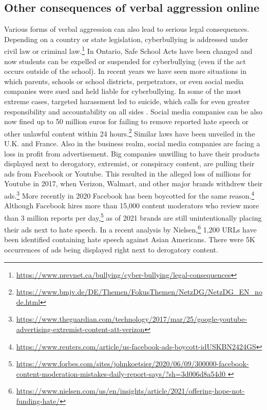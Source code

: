 \documentclass[a4paper,fleqn]{cas-dc}
\begin{document}
\subsection{Other consequences of verbal aggression online}

Various forms of verbal aggression can also lead to serious legal consequences. Depending on a country or state legislation, cyberbullying is addressed under civil law or criminal law.\footnote{\url{https://www.prevnet.ca/bullying/cyber-bullying/legal-consequences}} In Ontario, Safe School Acts have been changed and now students can be expelled or suspended for cyberbullying (even if the act occurs outside of the school). 
In recent years we have seen more situations in which parents, schools or school districts, perpetrators, or even social media companies were sued and held liable for cyberbullying. In some of the most extreme cases, targeted harassment led to suicide, which calls for even greater responsibility and accountability on all sides \citep{John2018Cyberbullying}. 
Social media companies can be also now fined up to 50 million euros for failing to remove reported hate speech or other unlawful content within 24 hours.\footnote{\url{https://www.bmjv.de/DE/Themen/FokusThemen/NetzDG/NetzDG_EN_node.html}} Similar laws have been unveiled in the U.K. and France. 
Also in the business realm, social media companies are facing a loss in profit from advertisement. Big companies unwilling to have their products displayed next to derogatory, extremist, or conspiracy content, are pulling their ads from Facebook or Youtube. This resulted in the alleged loss of millions for Youtube in 2017, when Verizon, Walmart, and other major brands withdrew their ads.\footnote{\url{https://www.theguardian.com/technology/2017/mar/25/google-youtube-advertising-extremist-content-att-verizon}} More recently in 2020 Facebook has been boycotted for the same reason.\footnote{\url{https://www.reuters.com/article/us-facebook-ads-boycott-idUSKBN2424GS}} Although Facebook hires more than 15,000 content moderators who review more than 3 million reports per day,\footnote{\url{https://www.forbes.com/sites/johnkoetsier/2020/06/09/300000-facebook-content-moderation-mistakes-daily-report-says/?sh=3d006d8a54d0 }} as of 2021 brands are still unintentionally placing their ads next to hate speech. In a recent analysis by Nielsen,\footnote{\url{https://www.nielsen.com/us/en/insights/article/2021/offering-hope-not-funding-hate/}} 1,200 URLs have been identified containing hate speech against Asian Americans. There were 5K occurrences of ads being displayed right next to derogatory content. 
\end{document}
